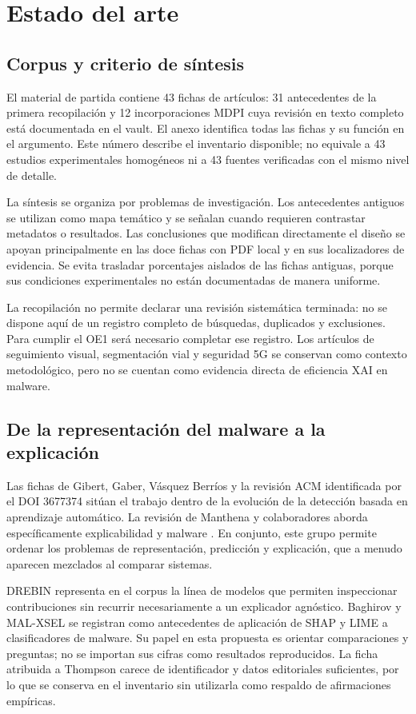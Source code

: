 \chapter{Estado del arte}
\section{Corpus y criterio de síntesis}
El material de partida contiene 43 fichas de artículos: 31 antecedentes de la primera recopilación y 12 incorporaciones MDPI cuya revisión en texto completo está documentada en el vault. El anexo identifica todas las fichas y su función en el argumento. Este número describe el inventario disponible; no equivale a 43 estudios experimentales homogéneos ni a 43 fuentes verificadas con el mismo nivel de detalle.

La síntesis se organiza por problemas de investigación. Los antecedentes antiguos se utilizan como mapa temático y se señalan cuando requieren contrastar metadatos o resultados. Las conclusiones que modifican directamente el diseño se apoyan principalmente en las doce fichas con PDF local y en sus localizadores de evidencia. Se evita trasladar porcentajes aislados de las fichas antiguas, porque sus condiciones experimentales no están documentadas de manera uniforme.

La recopilación no permite declarar una revisión sistemática terminada: no se dispone aquí de un registro completo de búsquedas, duplicados y exclusiones. Para cumplir el OE1 será necesario completar ese registro. Los artículos de seguimiento visual, segmentación vial y seguridad 5G se conservan como contexto metodológico, pero no se cuentan como evidencia directa de eficiencia XAI en malware.

\section{De la representación del malware a la explicación}
Las fichas de Gibert, Gaber, Vásquez Berríos y la revisión ACM identificada por el DOI 3677374 sitúan el trabajo dentro de la evolución de la detección basada en aprendizaje automático. La revisión de Manthena y colaboradores aborda específicamente explicabilidad y malware \parencite{Manthena2025}. En conjunto, este grupo permite ordenar los problemas de representación, predicción y explicación, que a menudo aparecen mezclados al comparar sistemas.

DREBIN representa en el corpus la línea de modelos que permiten inspeccionar contribuciones sin recurrir necesariamente a un explicador agnóstico. Baghirov y MAL-XSEL se registran como antecedentes de aplicación de SHAP y LIME a clasificadores de malware. Su papel en esta propuesta es orientar comparaciones y preguntas; no se importan sus cifras como resultados reproducidos. La ficha atribuida a Thompson carece de identificador y datos editoriales suficientes, por lo que se conserva en el inventario sin utilizarla como respaldo de afirmaciones empíricas.

